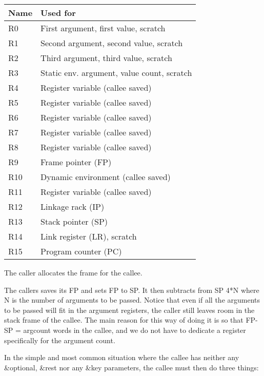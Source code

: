 \begin{tabular}{|l|l|}
\hline
Name & Used for\\
\hline
\hline
R0 & First argument, first value, scratch\\
R1 & Second argument, second value, scratch \\
R2 & Third argument, third value, scratch \\
R3 & Static env. argument, value count, scratch \\
R4 & Register variable (callee saved) \\
R5 & Register variable (callee saved) \\
R6 & Register variable (callee saved) \\
R7 & Register variable (callee saved) \\
R8 & Register variable (callee saved) \\
R9 & Frame pointer (FP) \\
R10 & Dynamic environment (callee saved) \\
R11 & Register variable (callee saved)\\
R12 & Linkage rack (IP)\\
R13 & Stack pointer (SP)\\
R14 & Link register (LR), scratch \\
R15 & Program counter (PC) \\
\hline
\end{tabular}


The caller allocates the frame for the callee. 

The callers saves its FP and sets FP to SP.  It then subtracts from SP
4*N where N is the number of arguments to be passed.  Notice that even
if all the arguments to be passed will fit in the argument registers,
the caller still leaves room in the stack frame of the callee.  The
main reason for this way of doing it is so that FP-SP = argcount words in
the callee, and we do not have to dedicate a register specifically for
the argument count.

In the simple and most common situation where the callee has neither
any \&optional, \&rest nor any \&key parameters, the callee must then
do three things:

